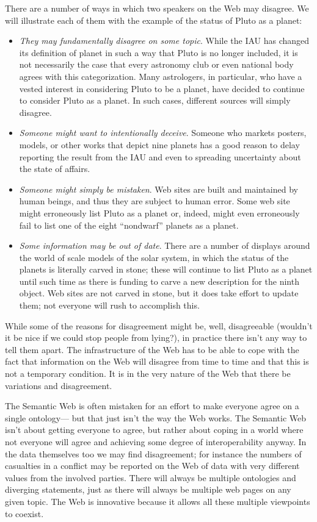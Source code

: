 There are a number of ways in which two speakers on the Web may
disagree. We will illustrate each of them with the example of the status
of Pluto as a planet:


\begin{itemize}
\item
  \emph{They may fundamentally disagree on some topic}. While the IAU
  has changed its definition of planet in such a way that Pluto is no
  longer included, it is not necessarily the case that every astronomy
  club or even national body agrees with this categorization. Many
  astrologers, in particular, who have a vested interest in considering
  Pluto to be a planet, have decided to continue to consider Pluto as a
  planet. In such cases, different sources will simply disagree.
\item
  \emph{Someone might want to intentionally deceive}. Someone who
  markets posters, models, or other works that depict nine planets has a
  good reason to delay reporting the result from the IAU and even to
  spreading uncertainty about the state of affairs.
\item
  \emph{Someone might simply be mistaken}. Web sites are built and
  maintained by human beings, and thus they are subject to human error.
  Some web site might erroneously list Pluto as a planet or, indeed,
  might even erroneously fail to list one of the eight ``nondwarf''
  planets as a planet.
\item
  \emph{Some information may be out of date}. There are a number of
  displays around the world of scale models of the solar system, in
  which the status of the planets is literally carved in stone; these
  will continue to list Pluto as a planet until such time as there is
  funding to carve a new description for the ninth object. Web sites are
  not carved in stone, but it does take effort to update them; not
  everyone will rush to accomplish this.
\end{itemize}


While some of the reasons for disagreement might be, well, disagreeable
(wouldn't it be nice if we could stop people from lying?), in practice
there isn't any way to tell them apart. The infrastructure of the Web
has to be able to cope with the fact that information on the Web will
disagree from time to time and that this is not a temporary condition.
It is in the very nature of the Web that there be variations and
disagreement.

The Semantic Web is often mistaken for an effort to make everyone agree
on a single ontology--- but that just isn't the way the Web works. The
Semantic Web isn't about getting everyone to agree, but rather about
coping in a world where not everyone will agree and achieving some
degree of interoperability anyway. In the data themselves too we may
find disagreement; for instance the numbers of casualties in a conflict
may be reported on the Web of data with very different values from the
involved parties. There will always be multiple ontologies and diverging
statements, just as there will always be multiple web pages on any given
topic. The Web is innovative because it allows all these multiple
viewpoints to coexist.

